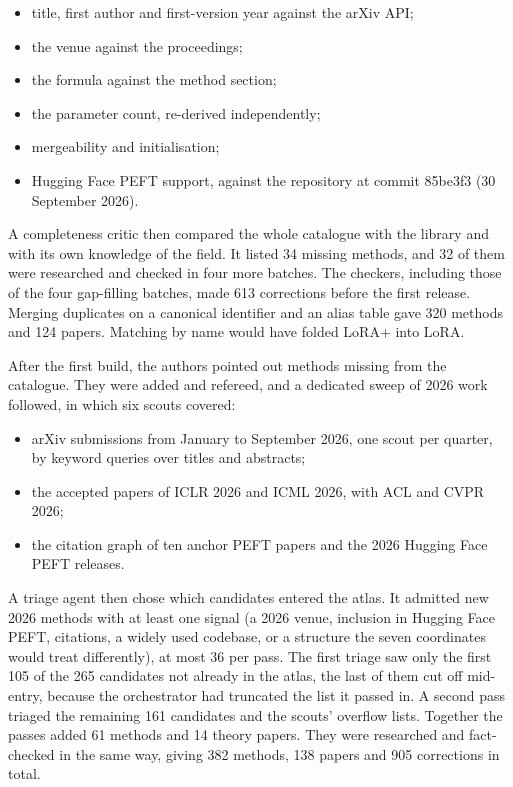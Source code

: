 \begin{itemize}
\item title, first author and first-version year against the arXiv API;
\item the venue against the proceedings;
\item the formula against the method section;
\item the parameter count, re-derived independently;
\item mergeability and initialisation;
\item Hugging Face PEFT support, against the repository at commit 85be3f3 (30 September 2026).
\end{itemize}

A completeness critic then compared the whole catalogue with the library and with its own knowledge of the field. It listed 34 missing methods, and 32 of them were researched and checked in four more batches. The checkers, including those of the four gap-filling batches, made 613 corrections before the first release. Merging duplicates on a canonical identifier and an alias table gave 320 methods and 124 papers. Matching by name would have folded LoRA+ into LoRA.

After the first build, the authors pointed out methods missing from the catalogue. They were added and refereed, and a dedicated sweep of 2026 work followed, in which six scouts covered:

\begin{itemize}
\item arXiv submissions from January to September 2026, one scout per quarter, by keyword queries over titles and abstracts;
\item the accepted papers of ICLR 2026 and ICML 2026, with ACL and CVPR 2026;
\item the citation graph of ten anchor PEFT papers and the 2026 Hugging Face PEFT releases.
\end{itemize}

A triage agent then chose which candidates entered the atlas. It admitted new 2026 methods with at least one signal (a 2026 venue, inclusion in Hugging Face PEFT, citations, a widely used codebase, or a structure the seven coordinates would treat differently), at most 36 per pass. The first triage saw only the first 105 of the 265 candidates not already in the atlas, the last of them cut off mid-entry, because the orchestrator had truncated the list it passed in. A second pass triaged the remaining 161 candidates and the scouts' overflow lists. Together the passes added 61 methods and 14 theory papers. They were researched and fact-checked in the same way, giving 382 methods, 138 papers and 905 corrections in total.

